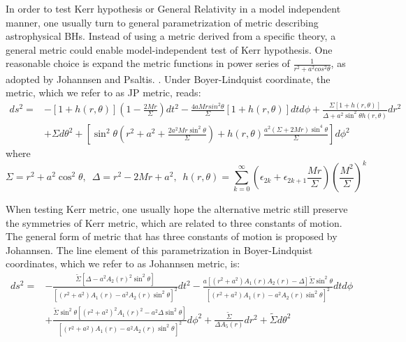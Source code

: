 \documentclass{article}
\begin{document}
In order to test Kerr hypothesis or General Relativity in a model independent manner, one usually turn to general parametrization of metric describing astrophysical BHs. Instead of using a metric derived from a specific theory, a general metric could enable model-independent test of Kerr hypothesis. One reasonable choice is expand the metric functions in power series of $\frac 1 {r^2+a^2cos^2\theta}$, as adopted by Johannsen and Psaltis. \cite{johannsen}. Under Boyer-Lindquist coordinate, the metric, which we refer to as JP metric, reads:
\begin{equation}
\begin{aligned}
	ds^2=&-[1+h(r,\theta)](1-\frac{2Mr}{\Sigma}) dt^2 - \frac{4aMrsin^2\theta}{\Sigma} [1+h(r,\theta)] dtd\phi + \frac{\Sigma[1+ h(r,\theta) ] }{ \Delta + a^2 \sin^2 \theta h(r,\theta )} dr^2  \\
	&+\Sigma d\theta^2 +[ \sin^2\theta (r^2+a^2 + \frac{2a^2Mr\sin^2\theta }{\Sigma}) + h(r,\theta ) \frac{a^2 (\Sigma +2Mr)\sin^4\theta  }{\Sigma} ] d\phi^2
\end{aligned}
\end{equation}
where
\begin{equation}
	\Sigma=r^2 +a^2\cos^2\theta,\,\,\,\Delta= r^2 - 2Mr +a^2 ,\,\,\,  h(r,\theta ) = \sum_{k=0}^{\infty} (\epsilon_{2k} + \epsilon_{2k+1} \frac{Mr}{\Sigma}) (\frac{M^2}{\Sigma})^k
\end{equation}

When testing Kerr metric, one usually hope the alternative metric still preserve the symmetries of Kerr metric, which are related to three constants of motion. The general form of metric that has three constants of motion is proposed by Johannsen\cite{johannsen_final}. The line element of this parametrization in Boyer-Lindquist coordinates, which we refer to as Johannsen metric, is:
\begin{equation}
\begin{aligned}
	ds^2 =& -\frac{\tilde{\Sigma} [\Delta - a^2 A_2(r)^2 \sin^2\theta ] }{ [ (r^2+a^2)A_1(r) - a^2 A_2(r) \sin^2\theta ]^2 } dt^2 -  \frac{a [(r^2 + a^2 )A_1(r)A_2(r) - \Delta ] \tilde{\Sigma} \sin^2\theta }{ [(r^2+a^2 ) A_1(r) -a^2 A_2(r) \sin^2 \theta ]^2 } dtd\phi\\
	& + \frac{\tilde{\Sigma} \sin^2\theta [(r^2+a^2)^2 A_1(r)^2 - a^2\Delta \sin^2\theta  ]}{ [(r^2+a^2)A_1(r) - a^2 A_2(r) \sin^2 \theta ]^2 } d\phi^2 +\frac{\tilde{\Sigma}}{\Delta A_5(r)} dr^2  + \tilde{\Sigma} d\theta^2
\end{aligned}
\end{equation}
\end{document}
